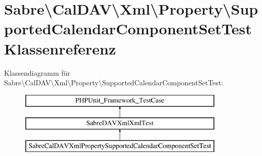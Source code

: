 \hypertarget{class_sabre_1_1_cal_d_a_v_1_1_xml_1_1_property_1_1_supported_calendar_component_set_test}{}\section{Sabre\textbackslash{}Cal\+D\+AV\textbackslash{}Xml\textbackslash{}Property\textbackslash{}Supported\+Calendar\+Component\+Set\+Test Klassenreferenz}
\label{class_sabre_1_1_cal_d_a_v_1_1_xml_1_1_property_1_1_supported_calendar_component_set_test}
Klassendiagramm für Sabre\textbackslash{}Cal\+D\+AV\textbackslash{}Xml\textbackslash{}Property\textbackslash{}Supported\+Calendar\+Component\+Set\+Test\+:\begin{figure}[H]
\begin{center}
\leavevmode
\includegraphics[height=3.000000cm]{class_sabre_1_1_cal_d_a_v_1_1_xml_1_1_property_1_1_supported_calendar_component_set_test}
\end{center}
\end{figure}
